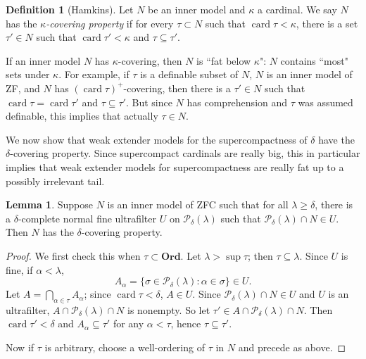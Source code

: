 \documentclass[12pt]{report}
\newcommand{\card}{\operatorname{card}}
\newcommand{\pset}{\mathcal{P}}
\newcommand{\Ord}{\mathbf{Ord}}
\newcommand{\dfn}[1]{\emph{#1}\index{#1}}
\theoremstyle{definition}
\newtheorem{lemma}[theorem]{Lemma}
\newtheorem{definition}[theorem]{Definition}
\begin{document}
\begin{definition}[Hamkins]
Let $N$ be an inner model and $\kappa$ a cardinal. We say $N$ has the \dfn{$\kappa$-covering property} if for every $\tau \subset N$ such that $\card \tau < \kappa$, there is a set $\tau' \in N$ such that $\card \tau' < \kappa$ and $\tau \subseteq \tau'$.
\end{definition}
If an inner model $N$ has $\kappa$-covering, then $N$ is ``fat below $\kappa$": $N$ contains ``most" sets under $\kappa$.
For example, if $\tau$ is a definable subset of $N$, $N$ is an inner model of ZF, and $N$ has $(\card \tau)^+$-covering, then there is a $\tau' \in N$ such that $\card \tau = \card \tau'$ and $\tau \subseteq \tau'$.
But since $N$ has comprehension and $\tau$ was assumed definable, this implies that actually $\tau \in N$.

We now show that weak extender models for the supercompactness of $\delta$ have the $\delta$-covering property.
Since supercompact cardinals are really big, this in particular implies that weak extender models for supercompactness are really fat up to a possibly irrelevant tail.
\begin{lemma}
Suppose $N$ is an inner model of ZFC such that for all $\lambda \geq \delta$, there is a $\delta$-complete normal fine ultrafilter $U$ on $\pset_\delta(\lambda)$ such that $\pset_\delta(\lambda) \cap N \in U$. Then $N$ has the $\delta$-covering property.
\end{lemma}
\begin{proof}
We first check this when $\tau \subset \Ord$. Let $\lambda > \sup \tau$; then $\tau \subseteq \lambda$.
Since $U$ is fine, if $\alpha < \lambda$,
$$A_\alpha = \{\sigma \in \pset_\delta(\lambda): \alpha \in \sigma\} \in U.$$
Let $A = \bigcap_{\alpha \in \tau} A_\alpha$; since $\card \tau < \delta$, $A \in U$.
Since $\pset_\delta(\lambda) \cap N \in U$ and $U$ is an ultrafilter, $A \cap \pset_\delta(\lambda) \cap N$ is nonempty.
So let $\tau' \in A \cap \pset_\delta(\lambda) \cap N$.
Then $\card \tau' < \delta$ and $A_\alpha \subseteq \tau'$ for any $\alpha < \tau$, hence $\tau \subseteq \tau'$.

Now if $\tau$ is arbitrary, choose a well-ordering of $\tau$ in $N$ and precede as above.
\end{proof}
\end{document}
